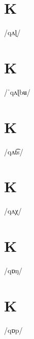 \documentclass[10pt,a4paper,twoside]{book}
\begin{document}
\section*{K}

\begin{multicols}{3}
 {/qʌɭ/} {}
\end{multicols}

\section*{K}

\begin{multicols}{3}
 {/ˈqʌɭbʉ/} {}
\end{multicols}

\section*{K}

\begin{multicols}{3}
 {/qʌt͡s/} {}
\end{multicols}

\section*{K}

\begin{multicols}{3}
 {/qʌχ/} {}
\end{multicols}

\section*{K}

\begin{multicols}{3}
 {/qɒŋ/} {}
\end{multicols}

\section*{K}

\begin{multicols}{3}
 {/qɒp/} {}
\end{multicols}
\end{document}
